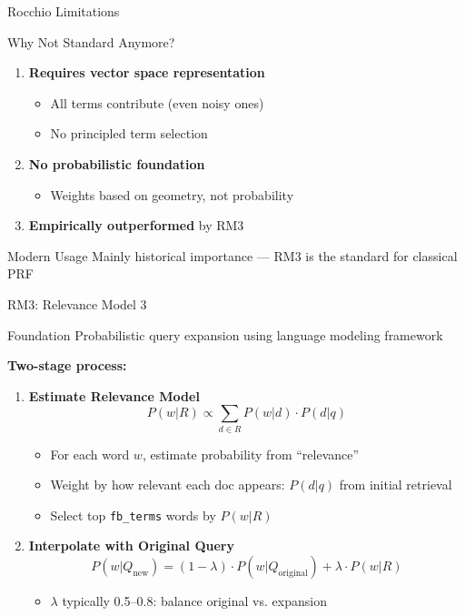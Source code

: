 \documentclass[aspectratio=169]{beamer}
\begin{document}
\begin{frame}[shrink=5]{Rocchio Limitations}
\begin{alertblock}{ Why Not Standard Anymore?}
\begin{enumerate}
    \item \textbf{Requires vector space representation}
    \begin{itemize}
        \item All terms contribute (even noisy ones)
        \item No principled term selection
    \end{itemize}
    \item \textbf{No probabilistic foundation}
    \begin{itemize}
        \item Weights based on geometry, not probability
    \end{itemize}
    \item \textbf{Empirically outperformed} by RM3
\end{enumerate}
\end{alertblock}

\vspace{1em}

\begin{block}{Modern Usage}
Mainly historical importance --- RM3 is the standard for classical PRF
\end{block}
\end{frame}

\begin{frame}{RM3: Relevance Model 3}
\begin{block}{Foundation}
Probabilistic query expansion using language modeling framework
\end{block}

\vspace{1em}

\textbf{Two-stage process:}

\begin{enumerate}
    \item \textbf{Estimate Relevance Model}
    $$P(w|R) \propto \sum_{d \in R} P(w|d) \cdot P(d|q)$$
    \begin{itemize}
        \item For each word $w$, estimate probability from ``relevance''
        \item Weight by how relevant each doc appears: $P(d|q)$ from initial retrieval
        \item Select top \texttt{fb\_terms} words by $P(w|R)$
    \end{itemize}
    
    \item \textbf{Interpolate with Original Query}
    $$P(w|Q_{\text{new}}) = (1-\lambda) \cdot P(w|Q_{\text{original}}) + \lambda \cdot P(w|R)$$
    \begin{itemize}
        \item $\lambda$ typically 0.5--0.8: balance original vs. expansion
    \end{itemize}
\end{enumerate}
\end{frame}
\end{document}
